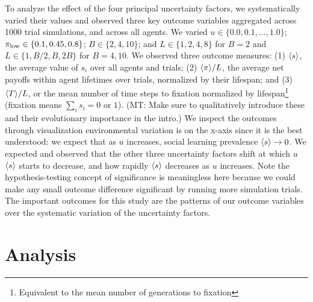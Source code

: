 \documentclass[letterpaper,11.5pt]{scrartcl}
\newcommand{\mt}[1]{{\textcolor{myorange} {({\tiny MT:} #1)}}}
\begin{document}
To analyze the effect of the four principal uncertainty factors, we systematically
varied their values and observed three key outcome variables aggregated across 1000
trial simulations, and across all agents. We varied $u \in \{0.0,
0.1, \ldots, 1.0\}$; $\pi_{\mathrm{low}} \in \{0.1, 0.45, 0.8\}$; $B \in \{2, 4, 10\}$; and $L
\in \{1,2,4,8\}$ for $B=2$ and $L \in \{1,B/2,B,2B\}$ for $B=4,10$.  We observed
three outcome measures: (1) $\langle s \rangle$, the average value of $s_i$ over all agents
and trials; (2) $\langle \pi \rangle / L$, the average net payoffs within agent lifetimes over
trials, normalized by their lifespan; and (3) $\langle T \rangle / L$, or the mean number
of time steps to fixation normalized by lifespan\footnote{Equivalent to the mean
number of generations to fixation} 
(fixation means $\sum_i s_i = 0 \text{ or } 1$). \mt{Make sure to qualitatively
introduce these and their evolutionary importance in the intro.}
We inspect the outcomes through visualization environmental
variation is on the x-axis since it is the best understood: we expect that as $u$
increases, social learning prevalence $\langle s \rangle \to 0$. We expected and observed
that the other three uncertainty factors shift at which $u$ $\langle s \rangle$ starts to
decrease, and how rapidly $\langle s \rangle$ decreases as $u$ increases. Note the
hypothesis-testing concept of significance is meaningless here because we could
make any small outcome difference significant by running more simulation trials.
The important outcomes for this study are the patterns of our outcome 
variables over the systematic variation of the uncertainty factors.


\section{Analysis}
\end{document}
